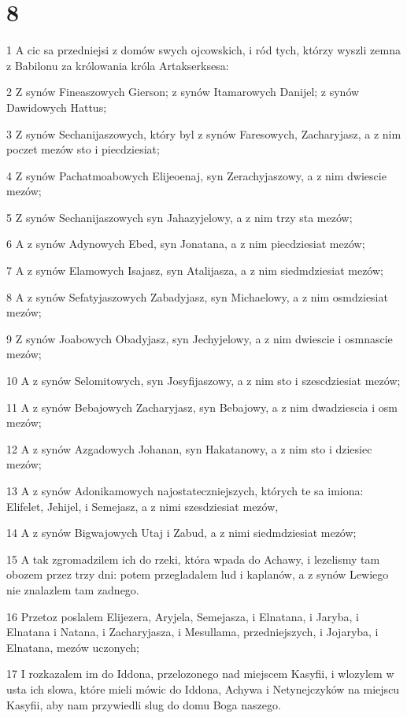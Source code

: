 \chapter{8}

\par 1 A cic sa przedniejsi z domów swych ojcowskich, i ród tych, którzy wyszli zemna z Babilonu za królowania króla Artakserksesa:
\par 2 Z synów Fineaszowych Gierson; z synów Itamarowych Danijel; z synów Dawidowych Hattus;
\par 3 Z synów Sechanijaszowych, który byl z synów Faresowych, Zacharyjasz, a z nim poczet mezów sto i piecdziesiat;
\par 4 Z synów Pachatmoabowych Elijeoenaj, syn Zerachyjaszowy, a z nim dwiescie mezów;
\par 5 Z synów Sechanijaszowych syn Jahazyjelowy, a z nim trzy sta mezów;
\par 6 A z synów Adynowych Ebed, syn Jonatana, a z nim piecdziesiat mezów;
\par 7 A z synów Elamowych Isajasz, syn Atalijasza, a z nim siedmdziesiat mezów;
\par 8 A z synów Sefatyjaszowych Zabadyjasz, syn Michaelowy, a z nim osmdziesiat mezów;
\par 9 Z synów Joabowych Obadyjasz, syn Jechyjelowy, a z nim dwiescie i osmnascie mezów;
\par 10 A z synów Selomitowych, syn Josyfijaszowy, a z nim sto i szescdziesiat mezów;
\par 11 A z synów Bebajowych Zacharyjasz, syn Bebajowy, a z nim dwadziescia i osm mezów;
\par 12 A z synów Azgadowych Johanan, syn Hakatanowy, a z nim sto i dziesiec mezów;
\par 13 A z synów Adonikamowych najostateczniejszych, których te sa imiona: Elifelet, Jehijel, i Semejasz, a z nimi szesdziesiat mezów,
\par 14 A z synów Bigwajowych Utaj i Zabud, a z nimi siedmdziesiat mezów;
\par 15 A tak zgromadzilem ich do rzeki, która wpada do Achawy, i lezelismy tam obozem przez trzy dni: potem przegladalem lud i kaplanów, a z synów Lewiego nie znalazlem tam zadnego.
\par 16 Przetoz poslalem Elijezera, Aryjela, Semejasza, i Elnatana, i Jaryba, i Elnatana i Natana, i Zacharyjasza, i Mesullama, przedniejszych, i Jojaryba, i Elnatana, mezów uczonych;
\par 17 I rozkazalem im do Iddona, przelozonego nad miejscem Kasyfii, i wlozylem w usta ich slowa, które mieli mówic do Iddona, Achywa i Netynejczyków na miejscu Kasyfii, aby nam przywiedli slug do domu Boga naszego.
